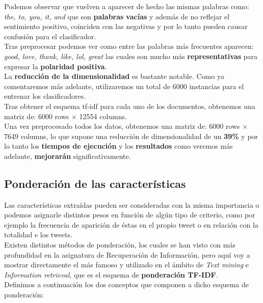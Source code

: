 \documentclass[a4paper,12pt]{report}
\begin{document}
{\setlength{\parindent}{0cm}
Podemos observar que vuelven a aparecer de hecho las mismas palabras como: \textit{the, to, you, it, and} que son \textbf{palabras} \textbf{vacías} y además de no reflejar el sentimiento positivo, coinciden con las negativas y por lo tanto pueden causar confusión para el clasificador. }
\vspace{2mm}\\
Tras preprocesar podemos ver como entre las palabras más frecuentes aparecen: \textit{good, love, thank, like, lol, great} las cuales son mucho más \textbf{representativas} para expresar la \textbf{polaridad positiva}.
\vspace{4mm}\\
La \textbf{reducción de la dimensionalidad} es bastante notable. Como ya comentaremos más adelante, utilizaremos un total de 6000 instancias para el entrenar los clasificadores. \\
Tras obtener el esquema tf-idf para cada uno de los documentos, obtenemos una matriz de:  6000 rows × 12554 columns.
\vspace{2mm}\\
Una vez preprocesado todos los datos, obtenemos una matriz de: 6000 rows × 7649 columns, 
lo que supone una reducción de dimensionalidad de un \textbf{39\%} y por lo tanto los \textbf{tiempos de ejecución} y los \textbf{resultados} como veremos más adelante, \textbf{mejorarán} significativamente. 
\vspace{4mm}

\subsection{Ponderación de las características}

{\setlength{\parindent}{0cm}
Las características extraídas pueden ser consideradas con la misma importancia o podemos asignarle distintos pesos en función de algún tipo de criterio, como por ejemplo la frecuencia de aparición de éstas en el propio tweet o en relación con la totalidad e los tweets.\vspace{2mm}\\
Existen distintos métodos de ponderación, los cuales se han visto con más profundidad en la asignatura de Recuperación de Información, pero aquí voy a mostrar directamente el más famoso y utilizado en el ámbito de \textit{Text mining} e \textit{Information retrieval}, que es el esquema de \textbf{ponderación TF-IDF}. 
\vspace{2mm}\\
Definimos a continuación los dos conceptos que componen a dicho esquema de ponderación: }
\vspace{2mm}
\end{document}
